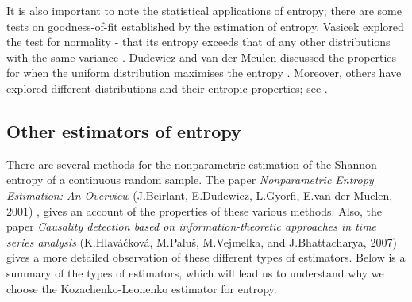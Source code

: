 \documentclass[12pt]{report}
\begin{document}
It is also important to note the statistical applications of entropy; there are some tests on goodness-of-fit established by the estimation of entropy. Vasicek explored the test for normality - that its entropy exceeds that of any other distributions with the same variance \cite{stat1}. Dudewicz and van der Meulen discussed the properties for when the uniform distribution maximises the entropy \cite{stat2}. Moreover, others have explored different distributions and their entropic properties; see \cite{stat3, stat4}.
 



\subsection{Other estimators of entropy} \label{otherestimators}

There are several methods for the nonparametric estimation of the Shannon entropy of a continuous random sample. The paper \textit{Nonparametric Entropy Estimation: An Overview} (J.Beirlant, E.Dudewicz, L.Gyorfi, E.van der Muelen, 2001) \cite{paper10}, gives an account of the properties of these various methods. Also, the paper \textit{Causality detection based on information-theoretic approaches in time series analysis} (K.Hlav\'{a}\v{c}kov\'{a}, M.Palu\v{s}, M.Vejmelka, and J.Bhattacharya, 2007) \cite{paper7} gives a more detailed observation of these different types of estimators. Below is a summary of the types of estimators, which will lead us to understand why we choose the Kozachenko-Leonenko estimator for entropy. 
\end{document}
